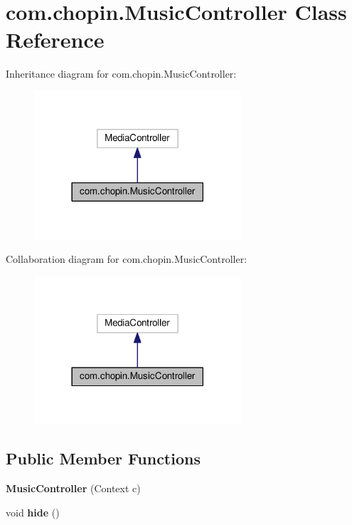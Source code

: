 \hypertarget{classcom_1_1chopin_1_1MusicController}{}\section{com.\+chopin.\+Music\+Controller Class Reference}
\label{classcom_1_1chopin_1_1MusicController}


Inheritance diagram for com.\+chopin.\+Music\+Controller\+:\nopagebreak
\begin{figure}[H]
\begin{center}
\leavevmode
\includegraphics[width=218pt]{classcom_1_1chopin_1_1MusicController__inherit__graph}
\end{center}
\end{figure}


Collaboration diagram for com.\+chopin.\+Music\+Controller\+:\nopagebreak
\begin{figure}[H]
\begin{center}
\leavevmode
\includegraphics[width=218pt]{classcom_1_1chopin_1_1MusicController__coll__graph}
\end{center}
\end{figure}
\subsection*{Public Member Functions}
\begin{DoxyCompactItemize}
\item 
\hypertarget{classcom_1_1chopin_1_1MusicController_a3f68f15cba5ad8a85ee59b54501f1e84}{}{\bfseries Music\+Controller} (Context c)\label{classcom_1_1chopin_1_1MusicController_a3f68f15cba5ad8a85ee59b54501f1e84}

\item 
\hypertarget{classcom_1_1chopin_1_1MusicController_ae50a2139682ad573643ddfd21aee6a54}{}void {\bfseries hide} ()\label{classcom_1_1chopin_1_1MusicController_ae50a2139682ad573643ddfd21aee6a54}

\end{DoxyCompactItemize}


